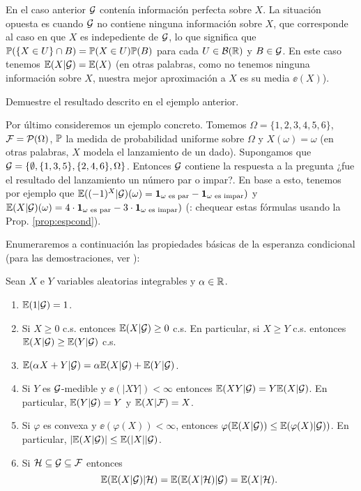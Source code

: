 \begin{ex}
En el caso anterior $\mathcal{G}$ contenía información perfecta sobre $X$.
La situación opuesta es cuando $\mathcal{G}$ no contiene ninguna información sobre $X$, que corresponde al caso en que $X$ es indepediente de $\mathcal{G}$, lo que significa que $\mathbb{P}(\{X\in U\}\cap B)=\mathbb{P}(X\in U)\mathbb{P}(B)$ para cada $U\in\mathcal{B}(\mathbb{R})$ y $B\in\mathcal{G}$.
En este caso tenemos $\mathbb{E}(X|\mathcal{G})=\mathbb{E}(X)$ (en otras palabras, como no tenemos ninguna información sobre $X$, nuestra mejor aproximación a $X$ es su media $\ee(X)$).
\end{ex}

\begin{exer}
Demuestre el resultado descrito en el ejemplo anterior.
\end{exer}

\begin{ex}
Por último consideremos un ejemplo concreto.
Tomemos $\Omega=\{1,2,3,4,5,6\}$, $\mathcal{F}=\mathcal{P}(\Omega)$, $\mathbb{P}$ la medida de probabilidad uniforme sobre $\Omega$ y $X(\omega)=\omega$ (en otras palabras, $X$ modela el lanzamiento de un dado).
Supongamos que $\mathcal{G}=\{\emptyset,\{1,3,5\},\{2,4,6\},\Omega\}$.
Entonces $\mathcal{G}$ contiene la respuesta a la pregunta ¿fue el resultado del lanzamiento un número par o impar?.
En base a esto, tenemos por ejemplo que $\mathbb{E}((-1)^X|\mathcal{G})(\omega)=\mathbf{1}_{\omega\text{\upshape{ es par}}}-\mathbf{1}_{\omega\text{\upshape{ es impar}}})$ y $\mathbb{E}(X|\mathcal{G})(\omega)=4\cdot\mathbf{1}_{\omega\text{\upshape{ es par}}}-3\cdot\mathbf{1}_{\omega\text{\upshape{ es impar}}})$ (\uexer: chequear estas fórmulas usando la Prop. \ref{prop:espcond}).
\end{ex}

Enumeraremos a continuación las propiedades básicas de la esperanza condicional (para las demostraciones, ver \cite{medidaJSM,durrett}):

\begin{prop}\label{prop:espcond}
Sean $X$ e $Y$ variables aleatorias integrables y $\alpha\in\mathbb{R}$.
\begin{enumerate}[label=\uptext{(\arabic*})]
\item $\mathbb{E}(1|\mathcal{G})=1$.
\item Si $X\geq0$ c.s. entonces $\mathbb{E}(X|\mathcal{G})\geq0$ c.s. En particular, si $X\geq Y$ c.s. entonces $\mathbb{E}(X|\mathcal{G})\geq\mathbb{E}(Y|\mathcal{G})$ c.s.
\item $\mathbb{E}(\alpha\hspace{0.05em} X+Y|\mathcal{G})=\alpha\mathbb{E}(X|\mathcal{G})+\mathbb{E}(Y|\mathcal{G})$.
\item Si $Y$ es $\mathcal{G}$-medible y $\ee(|XY|)<\infty$ entonces $\mathbb{E}(XY|\mathcal{G})=Y\mathbb{E}(X|\mathcal{G})$.
En particular, $\mathbb{E}(Y|\mathcal{G})=Y$ y $\mathbb{E}(X|\mathcal{F})=X$.
\item Si $\varphi$ es convexa y $\ee(\varphi(X))<\infty$, entonces $\varphi(\mathbb{E}(X|\mathcal{G}))\leq\mathbb{E}(\varphi(X)|\mathcal{G}))$.
En particular, $|\mathbb{E}(X|\mathcal{G})|\leq\mathbb{E}(|X||\mathcal{G})$.
\item Si $\mathcal{H}\subseteq\mathcal{G}\subseteq\mathcal{F}$ entonces
\[\mathbb{E}(\mathbb{E}(X|\mathcal{G})|\mathcal{H})=\mathbb{E}(\mathbb{E}(X|\mathcal{H})|\mathcal{G})=\mathbb{E}(X|\mathcal{H}).\]
\end{enumerate}
\end{prop}

